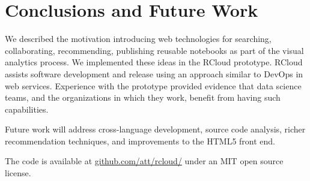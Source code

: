 \section{Conclusions and Future Work}

We described the motivation introducing web technologies
for searching, collaborating, recommending, publishing
reusable notebooks as part of the visual analytics process.
We implemented these ideas in the RCloud prototype.
RCloud assists software development and release using
an approach similar to DevOps in web services.
Experience with the prototype provided evidence that
data science teams, and the organizations in which they work,
benefit from having such capabilities.

Future work will address cross-language development,
source code analysis, richer recommendation techniques,
and improvements to the HTML5 front end.

The code is available 
at \url{github.com/att/rcloud/}
under an MIT open source license.
